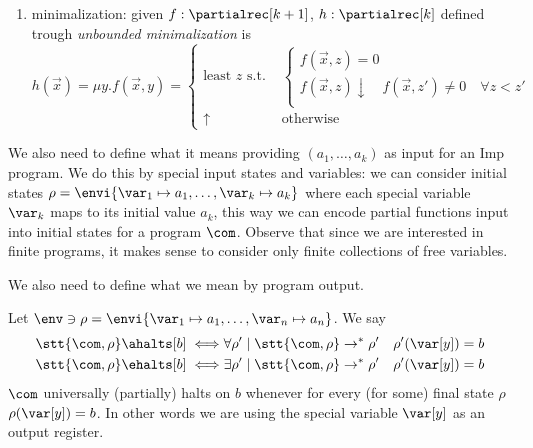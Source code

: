 \begin{definition}
\begin{enumerate}[label=(\arabic*)]
\begin{equation*}
\begin{cases}
      \end{cases}
    \end{equation*}
  \item\label{parec:3} minimalization: given \(f : \partialrec[k+1]\),
    \(h : \partialrec[k]\) defined trough \emph{unbounded
      minimalization} is
    \begin{equation*}
      h(\vec{x}) = \mu y . f(\vec{x}, y) = \begin{cases}
        \text{least } z \text{ s.t. } & \begin{cases}
          f(\vec{x}, z) = 0 \\
	  f(\vec{x}, z) \downarrow \quad f(\vec{x},z')\neq 0 \quad \forall z < z' \\
	\end{cases} \\
        \uparrow                      & \text{otherwise}
      \end{cases}
    \end{equation*}
  \end{enumerate}
\end{definition}
\noindent
We also need to define what it means providing \((a_1, \dots, a_k)\)
as input for an Imp program. We do this by special input states and
variables: we can consider initial states
\(\rho = \envi{\var_1 \mapsto a_1, \dots, \var_k \mapsto a_k}\) where
each special variable \(\var_k\) maps to its initial value \(a_k\),
this way we can encode partial functions input into initial states for
a program \(\com\). Observe that since we are interested in finite
programs, it makes sense to consider only finite collections of free
variables.

We also need to define what we mean by program output.
\begin{notation}
  Let \(\env \ni \rho = \envi{\var_1\mapsto a_1, \dots, \var_n \mapsto
    a_n}\). We say
  \begin{align*}
    \stt{\com, \rho}\ahalts[b] \iff & \forall \rho' \mid \stt{\com, \rho} \to^* \rho' \quad \rho'(\var[y]) = b \\
    \stt{\com, \rho}\ehalts[b] \iff & \exists \rho' \mid \stt{\com, \rho} \to^* \rho' \quad \rho'(\var[y]) = b
  \end{align*}
  \(\com\) universally (partially) halts on \(b\) whenever for every
  (for some) final state \(\rho\) \(\rho(\var[y]) = b\). In other
  words we are using the special variable \(\var[y]\) as an output
  register.
\end{notation}

